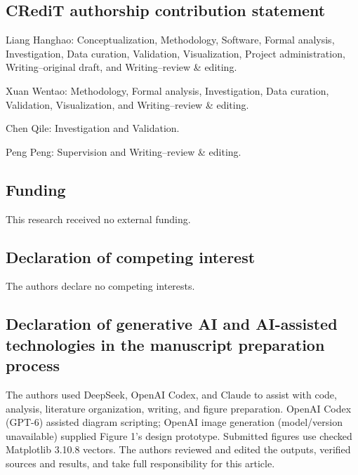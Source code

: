 \subsection*{CRediT authorship contribution statement}

Liang Hanghao: Conceptualization, Methodology, Software, Formal analysis, Investigation, Data curation, Validation, Visualization, Project administration, Writing--original draft, and Writing--review \& editing.

Xuan Wentao: Methodology, Formal analysis, Investigation, Data curation, Validation, Visualization, and Writing--review \& editing.

Chen Qile: Investigation and Validation.

Peng Peng: Supervision and Writing--review \& editing.

\subsection*{Funding}

This research received no external funding.

\subsection*{Declaration of competing interest}

The authors declare no competing interests.

\subsection*{Declaration of generative AI and AI-assisted technologies in the manuscript preparation process}

The authors used DeepSeek, OpenAI Codex, and Claude to assist with code, analysis, literature organization, writing, and figure preparation. OpenAI Codex (GPT-6) assisted diagram scripting; OpenAI image generation (model/version unavailable) supplied Figure 1's design prototype. Submitted figures use checked Matplotlib 3.10.8 vectors. The authors reviewed and edited the outputs, verified sources and results, and take full responsibility for this article.
